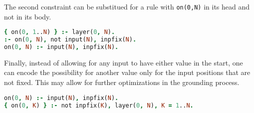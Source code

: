 The second constraint can be substitued for a rule with \texttt{on(0,N)} %
in its head and not in its body.

\begin{code}
\begin{lstlisting}[language=Prolog, numbers=none]
{ on(0, 1..N) } :- layer(0, N).
:- on(0, N), not input(N), inpfix(N).
on(0, N) :- input(N), inpfix(N).
\end{lstlisting}
    \nobreak{}\label{enc:fixed_input}
\end{code}

Finally, instead of allowing for any input to have either value in the start,
one can encode the possibility for another value only for the input positions
that are not fixed. This may allow for further optimizations in the grounding process.

\begin{code}
\begin{lstlisting}[language=Prolog, numbers=none]
on(0, N) :- input(N), inpfix(N).
{ on(0, K) } :- not inpfix(K), layer(0, N), K = 1..N.
\end{lstlisting}
    \nobreak{}\label{enc:fixed_direct}
\end{code}
